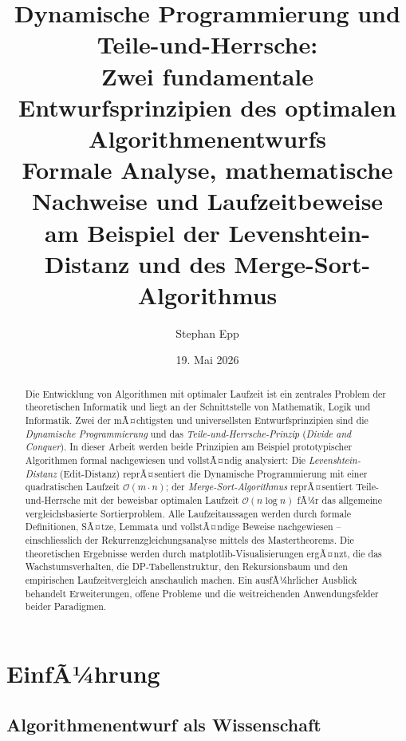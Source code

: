 ﻿\documentclass[a4paper,12pt]{article}
\title{\textbf{Dynamische Programmierung und Teile-und-Herrsche:}\\
\textbf{Zwei fundamentale Entwurfsprinzipien des optimalen Algorithmenentwurfs}\\
\large Formale Analyse, mathematische Nachweise und Laufzeitbeweise\\
am Beispiel der Levenshtein-Distanz und des Merge-Sort-Algorithmus}
\author{Stephan Epp}
\date{19. Mai 2026}
\theoremstyle{definition}
\begin{document}
\maketitle

\begin{abstract}
\noindent
Die Entwicklung von Algorithmen mit optimaler Laufzeit ist ein zentrales Problem der
theoretischen Informatik und liegt an der Schnittstelle von Mathematik, Logik und
Informatik. Zwei der mÃ¤chtigsten und universellsten Entwurfsprinzipien sind die
\emph{Dynamische Programmierung} und das \emph{Teile-und-Herrsche-Prinzip}
(\textit{Divide and Conquer}).
In dieser Arbeit werden beide Prinzipien am Beispiel prototypischer Algorithmen formal
nachgewiesen und vollstÃ¤ndig analysiert: Die \emph{Levenshtein-Distanz} (Edit-Distanz)
reprÃ¤sentiert die Dynamische Programmierung mit einer quadratischen Laufzeit
$\mathcal{O}(m \cdot n)$; der \emph{Merge-Sort-Algorithmus} reprÃ¤sentiert
Teile-und-Herrsche mit der beweisbar optimalen Laufzeit $\mathcal{O}(n \log n)$
fÃ¼r das allgemeine vergleichsbasierte Sortierproblem.
Alle Laufzeitaussagen werden durch formale Definitionen, SÃ¤tze, Lemmata und vollstÃ¤ndige
Beweise nachgewiesen -- einschliesslich der Rekurrenzgleichungsanalyse mittels
des Mastertheorems. Die theoretischen Ergebnisse werden durch matplotlib-Visualisierungen
ergÃ¤nzt, die das Wachstumsverhalten, die DP-Tabellenstruktur, den Rekursionsbaum
und den empirischen Laufzeitvergleich anschaulich machen.
Ein ausfÃ¼hrlicher Ausblick behandelt Erweiterungen, offene Probleme und
die weitreichenden Anwendungsfelder beider Paradigmen.
\end{abstract}

\tableofcontents
\newpage

\section{EinfÃ¼hrung}

\subsection{Algorithmenentwurf als Wissenschaft}
\end{document}
